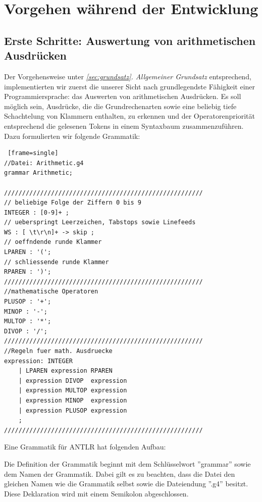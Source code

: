 
\section{Vorgehen während der Entwicklung}
\subsection{Erste Schritte: Auswertung von arithmetischen Ausdrücken}
\label{subsec:arithExp}
Der Vorgehensweise unter \textit{\ref{sec:grundsatz}. Allgemeiner Grundsatz} entsprechend, implementierten wir zuerst die unserer Sicht nach grundlegendste Fähigkeit einer Programmiersprache: das Auswerten von arithmetischen Ausdrücken. Es soll möglich sein, Ausdrücke, die die Grundrechenarten sowie eine beliebig tiefe Schachtelung von Klammern enthalten, zu erkennen und der Operatorenpriorität entsprechend die gelesenen Tokens in einem Syntaxbaum zusammenzuführen. Dazu formulierten wir folgende Grammatik:


\scriptsize\begin{lstlisting} [frame=single] 
//Datei: Arithmetic.g4
grammar Arithmetic;

///////////////////////////////////////////////////////
// beliebige Folge der Ziffern 0 bis 9
INTEGER : [0-9]+ ;        
// ueberspringt Leerzeichen, Tabstops sowie Linefeeds
WS : [ \t\r\n]+ -> skip ; 
// oeffndende runde Klammer
LPAREN : '(';		  	  
// schliessende runde Klammer
RPAREN : ')';		  	  
///////////////////////////////////////////////////////
//mathematische Operatoren
PLUSOP : '+';
MINOP : '-';
MULTOP : '*';
DIVOP : '/';
///////////////////////////////////////////////////////
//Regeln fuer math. Ausdruecke
expression: INTEGER					
	| LPAREN expression RPAREN		
	| expression DIVOP  expression  
	| expression MULTOP expression	
	| expression MINOP  expression 
	| expression PLUSOP expression 
	;			
///////////////////////////////////////////////////////

\end{lstlisting}
\normalsize
Eine Grammatik für ANTLR hat folgenden Aufbau:

Die Definition der Grammatik beginnt mit dem Schlüsselwort ''grammar'' sowie dem Namen der Grammatik. Dabei gilt es zu beachten, dass die Datei den gleichen Namen wie die Grammatik selbst sowie die Dateiendung ''.g4'' besitzt. Diese Deklaration wird mit einem Semikolon abgeschlossen.

